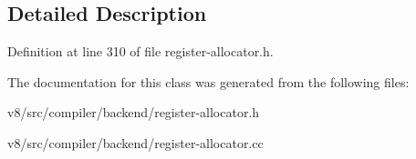 \subsection{Detailed Description}


Definition at line 310 of file register-\/allocator.\+h.



The documentation for this class was generated from the following files\+:\begin{DoxyCompactItemize}
\item 
v8/src/compiler/backend/register-\/allocator.\+h\item 
v8/src/compiler/backend/register-\/allocator.\+cc\end{DoxyCompactItemize}
